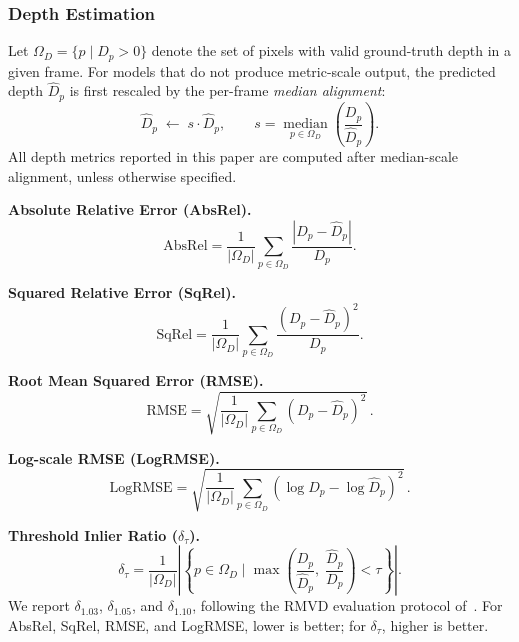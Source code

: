 \subsubsection{Depth Estimation}
\label{appendix:metrics:depth}
Let $\Omega_D = \{p \mid D_p > 0\}$ denote the set of pixels with valid ground-truth depth in a given frame.
%
For models that do not produce metric-scale output, the predicted depth $\hat{D}_p$ is first rescaled by the per-frame \emph{median alignment}:
\begin{equation}
  \hat{D}_p \;\leftarrow\; s\cdot\hat{D}_p,
  \qquad
  s = \operatorname*{median}_{p\in\Omega_D}\!\left(\frac{D_p}{\hat{D}_p}\right).
  \label{eq:median_align}
\end{equation}
%
All depth metrics reported in this paper are computed after median-scale alignment, unless otherwise specified.

\textbf{Absolute Relative Error (AbsRel).}
\begin{equation}
  \mathrm{AbsRel}
  = \frac{1}{|\Omega_D|}\sum_{p\in\Omega_D}
    \frac{\left|D_p - \hat{D}_p\right|}{D_p}.
  \label{eq:absrel}
\end{equation}

\textbf{Squared Relative Error (SqRel).}
\begin{equation}
  \mathrm{SqRel}
  = \frac{1}{|\Omega_D|}\sum_{p\in\Omega_D}
    \frac{\left(D_p - \hat{D}_p\right)^{2}}{D_p}.
  \label{eq:sqrel}
\end{equation}

\textbf{Root Mean Squared Error (RMSE).}
\begin{equation}
  \mathrm{RMSE}
  = \sqrt{\frac{1}{|\Omega_D|}\sum_{p\in\Omega_D}\!\left(D_p - \hat{D}_p\right)^{2}}\,.
  \label{eq:rmse}
\end{equation}

\textbf{Log-scale RMSE (LogRMSE).}
\begin{equation}
  \mathrm{LogRMSE}
  = \sqrt{\frac{1}{|\Omega_D|}\sum_{p\in\Omega_D}\!\left(\log D_p - \log\hat{D}_p\right)^{2}}\,.
  \label{eq:logrmse}
\end{equation}

\textbf{Threshold Inlier Ratio ($\delta_{\tau}$).}
\begin{equation}
  \delta_{\tau}
  = \frac{1}{|\Omega_D|}
    \left|\left\{p\in\Omega_D\;\Bigg|\;
      \max\!\left(\frac{D_p}{\hat{D}_p},\;\frac{\hat{D}_p}{D_p}\right) < \tau
    \right\}\right|.
  \label{eq:delta}
\end{equation}
We report $\delta_{1.03}$, $\delta_{1.05}$, and $\delta_{1.10}$, following the RMVD evaluation protocol of~\citet{schroeppel2022rmvd}.
%
For AbsRel, SqRel, RMSE, and LogRMSE, lower is better; for $\delta_{\tau}$, higher is better.


